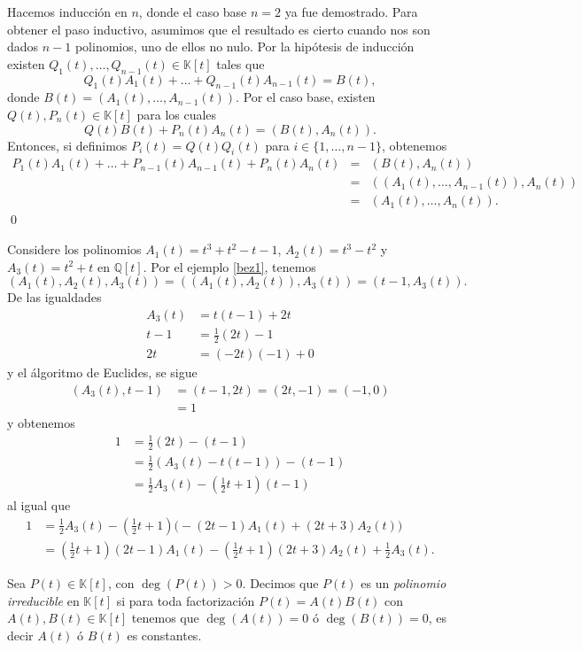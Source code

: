 \dem Hacemos inducción en $n$, donde el caso base $n=2$ ya fue demostrado. Para obtener el paso inductivo, asumimos que el resultado es cierto cuando nos son dados $n-1$ polinomios, uno de ellos no nulo. Por la hipótesis de inducción existen $Q_1(t),\ldots,Q_{n-1}(t)\in \mathbb{K}[t]$ tales que
\[
Q_1(t)A_1(t)+\ldots+Q_{n-1}(t)A_{n-1}(t)=B(t),
\]
donde $B(t)=\left(A_1(t),\ldots,A_{n-1}(t)\right)$. Por el caso base, existen $Q(t),P_n(t)\in \mathbb{K}[t]$ para los cuales
\[
Q(t)B(t)+P_n(t)A_n(t)=\left(B(t), A_n(t)\right).
\]
Entonces, si definimos $P_i(t)=Q(t)Q_i(t)$ para $i\in\{1,\ldots,n-1\}$, obtenemos
\begin{eqnarray*}
P_1(t)A_1(t)+\ldots+P_{n-1}(t)A_{n-1}(t)+P_n(t)A_n(t) & = & \left(B(t), A_n(t)\right)\\
 & = & \left(\left(A_1(t),\ldots,A_{n-1}(t)\right),A_n(t)\right)\\
 & = & \left(A_1(t),\ldots,A_n(t)\right).
\end{eqnarray*}
\qed

\begin{ejem}
Considere los polinomios $A_1(t)=t^3+t^2-t-1$, $A_2(t)=t^3-t^2$ y $A_3(t)=t^2+t$ en $\mathbb{Q}[t]$. Por el ejemplo \ref{bez1}, tenemos $$\left(A_1(t),A_2(t),A_3(t)\right)=\left(\left(A_1(t),A_2(t)\right),A_3(t)\right)=\left(t-1,A_3(t)\right).$$
De las igualdades
\begin{align*}
A_3(t)& =t(t-1)+2t\\
t-1& =\frac{1}{2}(2t)-1\\
2t & = (-2t)(-1)+0
\end{align*}
y el álgoritmo de Euclides, se sigue
\begin{align*}
(A_3(t),t-1) & =(t-1,2t) =(2t,-1) =(-1,0)\\
  & =1
\end{align*}
y obtenemos
\begin{align*}
1 &= \frac{1}{2}(2t)-(t-1)\\
  &= \frac{1}{2}(A_3(t)-t(t-1))-(t-1)\\
  &= \frac{1}{2}A_3(t)-(\frac{1}{2}t+1)(t-1)
\end{align*}
al igual que
\begin{align*}
1 &= \frac{1}{2}A_3(t)-(\frac{1}{2}t+1)\big(-(2t-1)A_1(t)+(2t+3)A_2(t)\big)\\
  &= (\frac{1}{2}t+1)(2t-1)A_1(t)-(\frac{1}{2}t+1)(2t+3)A_2(t)+\frac{1}{2}A_3(t).
\end{align*}
\end{ejem}

\begin{defn}
Sea $P(t)\in \mathbb{K}[t]$, con $\deg(P(t))>0$. Decimos que $P(t)$ es un \emph{polinomio irreducible} en $\mathbb{K}[t]$ si para toda factorización $P(t)=A(t)B(t)$ con $A(t),B(t)\in \mathbb{K}[t]$ tenemos que $\deg(A(t))=0$ ó $\deg(B(t))=0$, es decir $A(t)$ ó $B(t)$ es constantes.
\end{defn}

